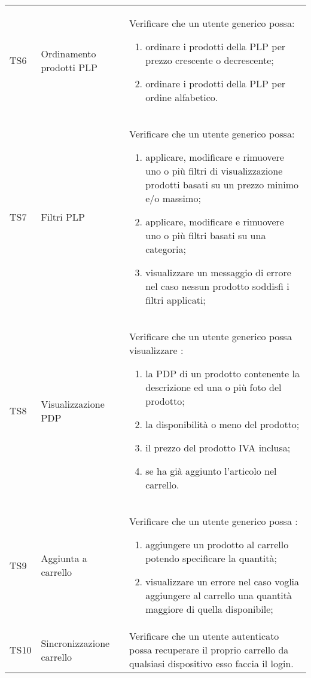 \begin{center}
\begin{longtable}{p{1cm}|p{6.85cm}|p{7cm}|}
	TS6 & Ordinamento prodotti PLP & Verificare che un utente generico possa: \begin{enumerate}
		\item  ordinare i prodotti della PLP per prezzo crescente o decrescente;
		\item  ordinare i prodotti della PLP per ordine alfabetico.
	\end{enumerate} \\

	TS7 & Filtri PLP & Verificare che un utente generico possa: \begin{enumerate}
		\item  applicare, modificare e rimuovere uno o più filtri di visualizzazione prodotti basati su un prezzo minimo e/o massimo;
		\item  applicare, modificare e rimuovere uno o più filtri basati su una categoria;
		\item  visualizzare un messaggio di errore nel caso nessun prodotto soddisfi i filtri applicati;
	\end{enumerate} \\

	TS8 & Visualizzazione PDP & Verificare che un utente generico possa visualizzare : \begin{enumerate}
		\item   la PDP di un prodotto contenente la descrizione ed una o più foto del prodotto;
		\item   la disponibilità o meno del prodotto;
		\item   il prezzo del prodotto IVA inclusa;
		\item   se ha già aggiunto l'articolo nel carrello.
	\end{enumerate} \\

	TS9 & Aggiunta a carrello & Verificare che un utente generico possa : \begin{enumerate}
		\item   aggiungere un prodotto al carrello potendo specificare la quantità;
		\item   visualizzare un errore nel caso voglia aggiungere al carrello una quantità maggiore di quella disponibile;
	
	\end{enumerate} \\

	TS10 & Sincronizzazione carrello & Verificare che un utente autenticato possa recuperare il proprio carrello da qualsiasi dispositivo esso faccia il login.\\





	\hline

	\end{longtable}
\end{center}

